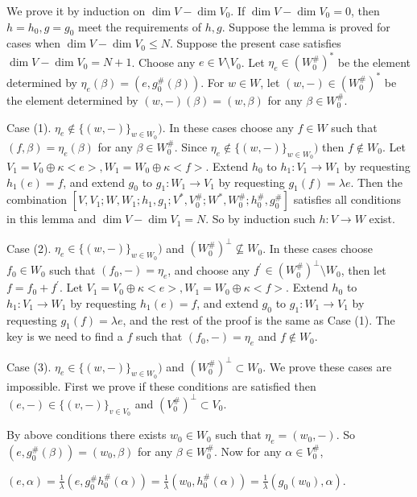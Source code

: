 \def\CTEXPreproc{Created by ctex v0.2.12, don't edit!}\documentclass[11pt]{article}
\begin{document}
\begin{pf} We prove it by induction on $\dim V-\dim V_0$. If $\dim V -\dim V_0 =0$, then $h=h_0 ,g=g_0$ meet the requirements of $h,g$. Suppose
the lemma is proved for cases when $\dim V-\dim V_0 \leq N$. Suppose the present case satisfies $\dim V - \dim V_0 = N+1$.
Choose any $e \in V\setminus V_0 $. Let $\eta_e \in ( W^{\#}_0 )^* $ be the element determined by $\eta_e ( \beta ) = (e,g^{\#} _0 (\beta)   )  $.  For $w\in W$, let $(w,-)\in ( W^{\#}_0 )^* $ be the element determined by $ (w,-)(\beta)= (w,\beta)  $ for any $\beta \in W^{\#}_0$.

Case (1). $\eta_e \notin \{ (w,-) \}_{w\in W_0 })$.   In these cases choose any $f\in W$ such that $(f, \beta)= \eta_e (\beta)$ for any $\beta \in W^{\#}_0 $. Since $\eta_e \notin \{ (w,-) \}_{w\in W_0 })$ then $f\notin W_0 $. Let $V_1 =V_0 \oplus \kappa<e> ,
 W_1 = W_0 \oplus \kappa<f> $. Extend $h_0 $ to $h_1 : V_1 \rightarrow W_1$ by requesting $h_1 (e)= f$, and extend $g_0 $ to $g_1 : W_1 \rightarrow V_1$ by requesting $g_1 (f)= \lambda e$. Then the combination $[ V ,V_1 ; W, W_1 ; h_1 , g_1 ; V^*  ,V^{\#}_0 ; W^{*}, W^{\#}_0 ; h^{\#}_0 , g^{\#}_0   ]$ satisfies all conditions in this lemma and $\dim V -\dim V_1 =N $. So by induction such $h:V\rightarrow W$ exist.

 Case (2).  $\eta_e \in \{ (w,-) \}_{w\in W_0 })$ and $( W^{\#}_0   )^{\perp} \nsubseteq  W_0 $. In these cases choose $f_0 \in W_0$ such that $(f_0 ,-  )= \eta_e  $, and choose any $f^{'}\in ( W^{\#}_0   )^{\perp}\setminus W_0 $, then let $f= f_0 + f^{'}$. Let $V_1 =V_0 \oplus \kappa<e> , W_1 = W_0 \oplus \kappa<f> $. Extend $h_0 $ to $h_1 : V_1 \rightarrow W_1$ by requesting $h_1 (e)= f$, and extend $g_0 $ to $g_1 : W_1 \rightarrow V_1$ by requesting $g_1 (f)= \lambda e$, and the rest of the proof is the same as Case (1).  The key is we need to find a $f$ such that  $(f_0 ,-  )= \eta_e  $ and $f\notin W_0$.

 Case (3).  $\eta_e \in \{ (w,-) \}_{w\in W_0 })$ and $( W^{\#}_0   )^{\perp} \subset  W_0 $.  We prove these cases are impossible.
 First we prove if these conditions are satisfied then $(e,- )\in \{ (v,-) \}_{v\in V_0 }  $ and $( V^{\#}_0  )^{\perp} \subset V_0  $.

 By above conditions there exists $w_0 \in W_0$ such that $ \eta_e = (w_0 ,- )$. So $ (e, g^{\#}_0 (\beta)   )=(w_0 ,\beta) $
for any $\beta \in W^{\#}_0$. Now for any $\alpha\in V^{\#}_0$,

$(e,\alpha)=\frac{1}{\lambda}(e,g^{\#}_0 h^{\#}_0 (\alpha) ) = \frac{1}{\lambda}(w_0 ,h^{\#}_0 (\alpha))=
 \frac{1}{\lambda}( g_0 (w_0 ) , \alpha ) $.


\end{pf}
\end{document}
